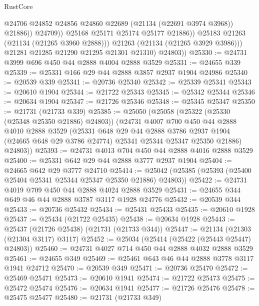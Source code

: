 \begin{lexlean}{RustCore}
\begin{coremodule}
                          @24706
                          @24852
                          @24856
                          @24860
                          @22689
                          (@21134 (@22691 @3974 @3968))
                          @21886))
                      @24709))
                  @25168
                  @25171
                  @25174
                  @25177
                  @21886))
              @25183
              @21263
              (@21134 (@21265 @3960 @2888)))
            @21263
            (@21134 (@21265 @3929 @3986)))
          @21281
          @21285
          @21290
          @21295
          @21301
          @21310)
        @24803))
@25330 := @24731 @3999 @696 @450 @44 @2888 @4004 @2888 @3529
@25331 := @24655 @339
@25339 := @25331 @166 @29 @44 @2888 @3857 @2937 @1904 @24986
@25340 := @20539 @339
@25341 := @20736 @25340
@25342 := @25339 @25341
@25343 := @20610 @1904
@25344 := @21722 @25343
@25345 := @25342 @25344
@25346 := @20634 @1904
@25347 := @21726 @25346
@25348 := @25345 @25347
@25350 := @21731 (@21733 @339)
@25385 := @25050
    (@25058
      (@25322 (@25330 (@25348 @25350 @21886) @24803))
      (@24731
        @4007
        @700
        @450
        @44
        @2888
        @4010
        @2888
        @3529
        (@25331
          @648
          @29
          @44
          @2888
          @3786
          @2937
          @1904
          (@24665 @648 @29 @3786 @24774)
          @25341
          @25344
          @25347
          @25350
          @21886)
        @24803))
@25393 := @24731 @4013 @704 @450 @44 @2888 @4016 @2888 @3529
@25400 := @25331 @642 @29 @44 @2888 @3777 @2937 @1904
@25404 := @24665 @642 @29 @3777 @24710
@25414 := @25042 (@25385 (@25393 (@25400 @25404 @25341 @25344 @25347 @25350 @21886) @24803))
@25422 := @24731 @4019 @709 @450 @44 @2888 @4024 @2888 @3529
@25431 := @24655 @344 @649 @46 @44 @2888 @3787 @3117 @1928 @24776
@25432 := @20539 @344
@25433 := @20736 @25432
@25434 := @25431 @25433
@25435 := @20610 @1928
@25437 := @25434 (@21722 @25435)
@25438 := @20634 @1928
@25443 := @25437 (@21726 @25438) (@21731 (@21733 @344))
@25447 := @21134 (@21303 (@21304 @3117) @3117)
@25452 := @25034 (@25414 (@25422 (@25443 @25447) @24803))
@25460 := @24731 @4027 @714 @450 @44 @2888 @4032 @2888 @3529
@25461 := @24655 @349
@25469 := @25461 @643 @46 @44 @2888 @3778 @3117 @1941 @24712
@25470 := @20539 @349
@25471 := @20736 @25470
@25472 := @25469 @25471
@25473 := @20610 @1941
@25474 := @21722 @25473
@25475 := @25472 @25474
@25476 := @20634 @1941
@25477 := @21726 @25476
@25478 := @25475 @25477
@25480 := @21731 (@21733 @349)

\end{coremodule}
\end{lexlean}
